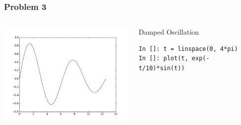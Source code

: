 \documentclass[14pt,compress]{beamer}
\begin{document}
\begin{frame}[fragile]
  \frametitle{Problem 3}
  \begin{columns}
    \hspace*{-0.5in}
    \includegraphics[height=2in, interpolate=true]{data/exercises/damp}
    \begin{block}{Damped Oscillation}
    \tiny
    \begin{lstlisting}
In []: t = linspace(0, 4*pi)
In []: plot(t, exp(-t/10)*sin(t))
    \end{lstlisting}
    \end{block}
  \end{columns}
\end{frame}
\end{document}
